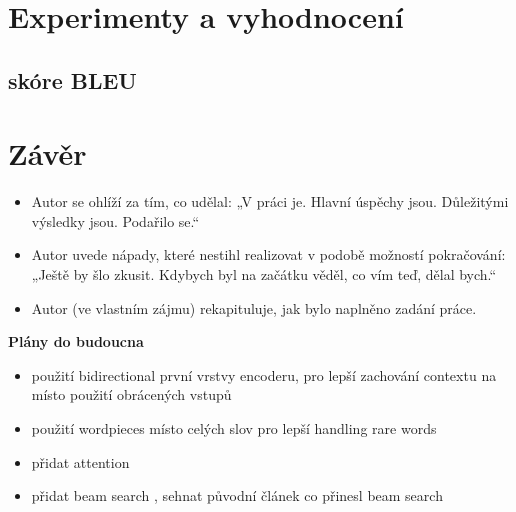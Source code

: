 \chapter{Experimenty a vyhodnocení}
\section{skóre BLEU}



\chapter{Závěr}
\begin{itemize}
  \item Autor se ohlíží za tím, co udělal: „V práci je. Hlavní úspěchy jsou. Důležitými výsledky jsou. Podařilo se.“
  \item Autor uvede nápady, které nestihl realizovat v podobě možností pokračování: „Ještě by šlo zkusit. Kdybych byl na začátku věděl, co vím teď, dělal bych.“
  \item Autor (ve vlastním zájmu) rekapituluje, jak bylo naplněno zadání práce.
\end{itemize}

\textbf{Plány do budoucna}
\begin{itemize}
    \item použití bidirectional první vrstvy encoderu, pro lepší zachování contextu \cite{googleBridgingGap} na místo použití obrácených vstupů
    \item použití wordpieces \cite{googleBridgingGap} místo celých slov pro lepší handling rare words
    \item přidat attention \cite{attention}
    \item přidat beam search \cite{nmtTutorial}, sehnat původní článek co přinesl beam search
\end{itemize}
